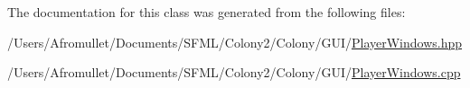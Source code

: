 The documentation for this class was generated from the following files\+:\begin{DoxyCompactItemize}
\item 
/\+Users/\+Afromullet/\+Documents/\+S\+F\+M\+L/\+Colony2/\+Colony/\+G\+U\+I/\mbox{\hyperlink{_player_windows_8hpp}{Player\+Windows.\+hpp}}\item 
/\+Users/\+Afromullet/\+Documents/\+S\+F\+M\+L/\+Colony2/\+Colony/\+G\+U\+I/\mbox{\hyperlink{_player_windows_8cpp}{Player\+Windows.\+cpp}}\end{DoxyCompactItemize}
